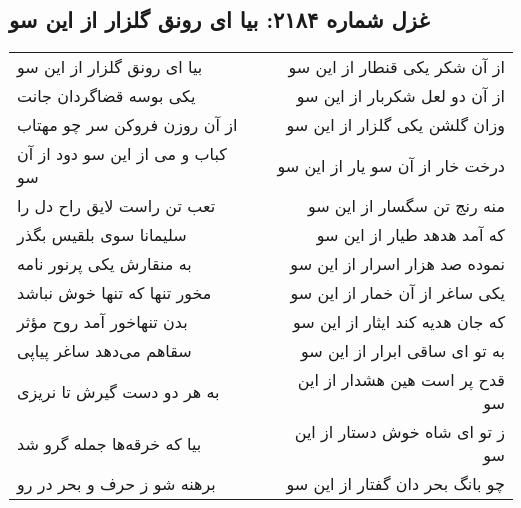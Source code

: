 \begin{center}
\section*{غزل شماره ۲۱۸۴: بیا ای رونق گلزار از این سو}
\label{sec:2184}
\begin{longtable}{l p{0.5cm} r}
بیا ای رونق گلزار از این سو
&&
از آن شکر یکی قنطار از این سو
\\
یکی بوسه قضاگردان جانت
&&
از آن دو لعل شکربار از این سو
\\
از آن روزن فروکن سر چو مهتاب
&&
وزان گلشن یکی گلزار از این سو
\\
کباب و می از این سو دود از آن سو
&&
درخت خار از آن سو یار از این سو
\\
تعب تن راست لایق راح دل را
&&
منه رنج تن سگسار از این سو
\\
سلیمانا سوی بلقیس بگذر
&&
که آمد هدهد طیار از این سو
\\
به منقارش یکی پرنور نامه
&&
نموده صد هزار اسرار از این سو
\\
مخور تنها که تنها خوش نباشد
&&
یکی ساغر از آن خمار از این سو
\\
بدن تنهاخور آمد روح مؤثر
&&
که جان هدیه کند ایثار از این سو
\\
سقاهم می‌دهد ساغر پیاپی
&&
به تو ای ساقی ابرار از این سو
\\
به هر دو دست گیرش تا نریزی
&&
قدح پر است هین هشدار از این سو
\\
بیا که خرقه‌ها جمله گرو شد
&&
ز تو ای شاه خوش دستار از این سو
\\
برهنه شو ز حرف و بحر در رو
&&
چو بانگ بحر دان گفتار از این سو
\\
\end{longtable}
\end{center}
